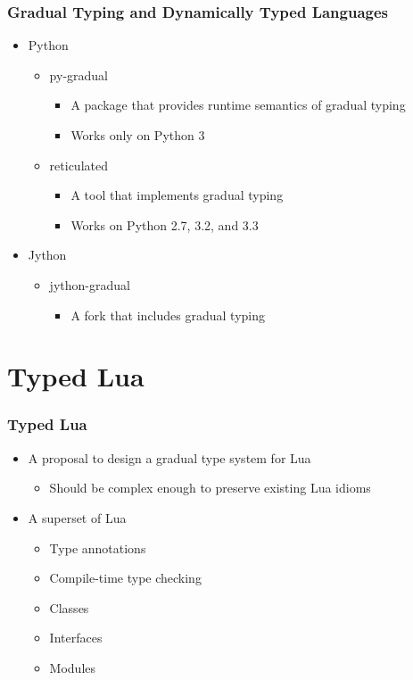 \documentclass{beamer}
\begin{document}
\begin{frame}
\frametitle{Gradual Typing and Dynamically Typed Languages}
\begin{itemize}
\item Python
\begin{itemize}
\item py-gradual
\begin{itemize}
\item A package that provides runtime semantics of gradual typing
\item Works only on Python 3
\end{itemize}
\item reticulated
\begin{itemize}
\item A tool that implements gradual typing
\item Works on Python 2.7, 3.2, and 3.3
\end{itemize}
\end{itemize}
\item Jython
\begin{itemize}
\item jython-gradual
\begin{itemize}
\item A fork that includes gradual typing
\end{itemize}
\end{itemize}
\end{itemize}
\end{frame}

\section{Typed Lua}
\begin{frame}
\frametitle{Typed Lua}
\begin{itemize}
\item A proposal to design a gradual type system for Lua
\begin{itemize}
\item Should be complex enough to preserve existing Lua idioms
\end{itemize}
\item A superset of Lua
\begin{itemize}
\item Type annotations
\item Compile-time type checking
\item Classes
\item Interfaces
\item Modules
\end{itemize}
\end{itemize}
\end{frame}
\end{document}
